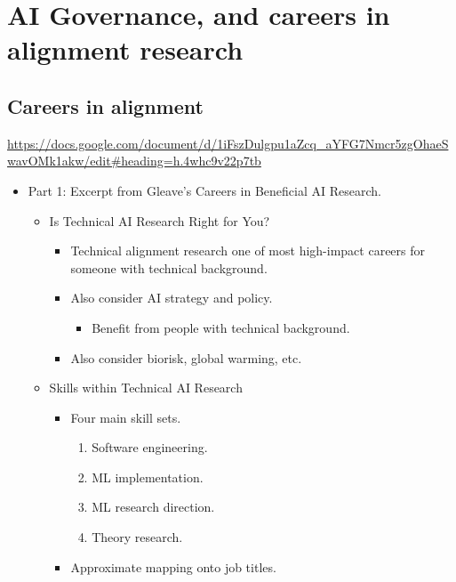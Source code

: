 
\chapter{AI Governance, and careers in alignment research}


\section{Careers in alignment}

\url{https://docs.google.com/document/d/1iFszDulgpu1aZcq_aYFG7Nmcr5zgOhaeSwavOMk1akw/edit#heading=h.4whc9v22p7tb}

\begin{itemize}
    \item Part 1: Excerpt from Gleave's Careers in Beneficial AI Research.
    \begin{itemize}
        \item Is Technical AI Research Right for You?
        \begin{itemize}
            \item Technical alignment research one of most high-impact careers for someone with technical background.
            \item Also consider AI strategy and policy.
            \begin{itemize}
                \item Benefit from people with technical background.
            \end{itemize}
            \item Also consider biorisk, global warming, etc.
        \end{itemize}
        \item Skills within Technical AI Research
        \begin{itemize}
            \item Four main skill sets.
            \begin{enumerate}[label=(\Alph*)]
                \item\label{item:se; careers} Software engineering.
                \item\label{item:ml imp; careers} ML implementation.
                \item\label{item:ml rea; careers} ML research direction.
                \item\label{item:tr; careers} Theory research.
            \end{enumerate}
            \item Approximate mapping onto job titles.

\end{itemize}
\end{itemize}
\end{itemize}
